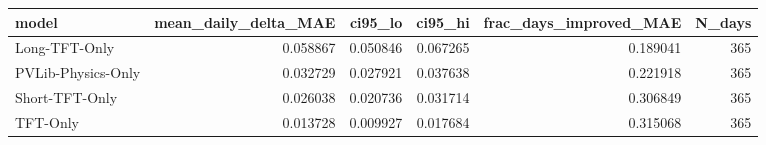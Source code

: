 \begin{tabular}{lrrrrr}
\toprule
model & mean_daily_delta_MAE & ci95_lo & ci95_hi & frac_days_improved_MAE & N_days \\
\midrule
Long-TFT-Only & 0.058867 & 0.050846 & 0.067265 & 0.189041 & 365 \\
PVLib-Physics-Only & 0.032729 & 0.027921 & 0.037638 & 0.221918 & 365 \\
Short-TFT-Only & 0.026038 & 0.020736 & 0.031714 & 0.306849 & 365 \\
TFT-Only & 0.013728 & 0.009927 & 0.017684 & 0.315068 & 365 \\
\bottomrule
\end{tabular}
